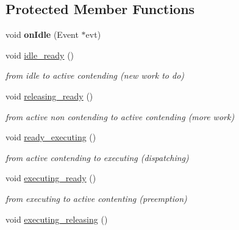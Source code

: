 \subsection*{Protected Member Functions}
\begin{DoxyCompactItemize}
\item 
void {\bfseries on\+Idle} (Event $\ast$evt)\hypertarget{classRTSim_1_1Grub_a4b5c38e4b49b5861e952d6c8f11745bf}{}\label{classRTSim_1_1Grub_a4b5c38e4b49b5861e952d6c8f11745bf}

\item 
void \hyperlink{classRTSim_1_1Grub_a9f4f4899baa3e2642e78a89b248f82da}{idle\+\_\+ready} ()\hypertarget{classRTSim_1_1Grub_a9f4f4899baa3e2642e78a89b248f82da}{}\label{classRTSim_1_1Grub_a9f4f4899baa3e2642e78a89b248f82da}

\begin{DoxyCompactList}\small\item\em from idle to active contending (new work to do) \end{DoxyCompactList}\item 
void \hyperlink{classRTSim_1_1Grub_aaaff9a4f4ce57a3a1018f1aa5d38423b}{releasing\+\_\+ready} ()\hypertarget{classRTSim_1_1Grub_aaaff9a4f4ce57a3a1018f1aa5d38423b}{}\label{classRTSim_1_1Grub_aaaff9a4f4ce57a3a1018f1aa5d38423b}

\begin{DoxyCompactList}\small\item\em from active non contending to active contending (more work) \end{DoxyCompactList}\item 
void \hyperlink{classRTSim_1_1Grub_afd54119efef5430baeb3e40022818b2f}{ready\+\_\+executing} ()\hypertarget{classRTSim_1_1Grub_afd54119efef5430baeb3e40022818b2f}{}\label{classRTSim_1_1Grub_afd54119efef5430baeb3e40022818b2f}

\begin{DoxyCompactList}\small\item\em from active contending to executing (dispatching) \end{DoxyCompactList}\item 
void \hyperlink{classRTSim_1_1Grub_a28218a37c52dc25ca4b64c99c6a4fe84}{executing\+\_\+ready} ()\hypertarget{classRTSim_1_1Grub_a28218a37c52dc25ca4b64c99c6a4fe84}{}\label{classRTSim_1_1Grub_a28218a37c52dc25ca4b64c99c6a4fe84}

\begin{DoxyCompactList}\small\item\em from executing to active contenting (preemption) \end{DoxyCompactList}\item 
void \hyperlink{classRTSim_1_1Grub_ad60ea63e1a566b88b3c7ccb4da3ce854}{executing\+\_\+releasing} ()\hypertarget{classRTSim_1_1Grub_ad60ea63e1a566b88b3c7ccb4da3ce854}{}\label{classRTSim_1_1Grub_ad60ea63e1a566b88b3c7ccb4da3ce854}


\end{DoxyCompactItemize}
